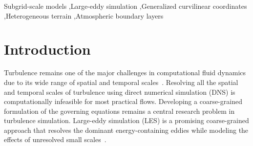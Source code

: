 \documentclass[final,3p]{elsarticle}
\begin{document}
\begin{frontmatter}
\begin{highlights}
\end{highlights}

\begin{keyword}
Subgrid-scale models \sep Large-eddy simulation \sep Generalized curvilinear coordinates  \sep Heterogeneous terrain \sep Atmospheric boundary layers



\end{keyword}

    
\end{frontmatter}




\section{\label{sec:introduction} Introduction}
Turbulence remains one of the major challenges in computational fluid dynamics due to its wide range of spatial and temporal scales~\cite{johnson2024multiscale}. Resolving all the spatial and temporal scales of turbulence using direct numerical simulation (DNS) is computationally infeasible for most practical flows. Developing a coarse-grained formulation of the governing equations remains a central research problem in turbulence simulation. Large-eddy simulation (LES) is a promising coarse-grained approach that resolves the dominant energy-containing eddies while modeling the effects of unresolved small scales~\cite{sagaut2005,pope2001turbulent}.  
\end{document}

